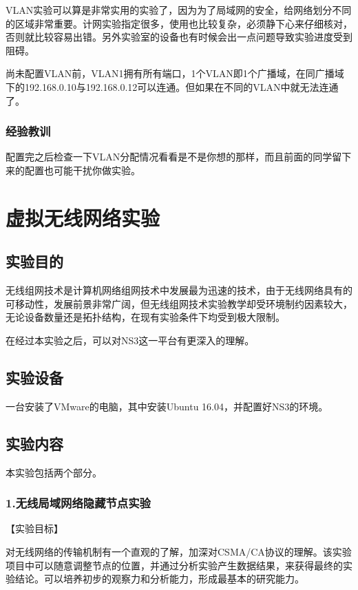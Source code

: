 \documentclass[lang=cn,11pt,a4paper,cite=authoryear]{elegantpaper}
\begin{document}
VLAN实验可以算是非常实用的实验了，因为为了局域网的安全，给网络划分不同的区域非常重要。计网实验指定很多，使用也比较复杂，必须静下心来仔细核对，否则就比较容易出错。另外实验室的设备也有时候会出一点问题导致实验进度受到阻碍。

尚未配置VLAN前，VLAN1拥有所有端口，1个VLAN即1个广播域，在同广播域下的192.168.0.10与192.168.0.12可以连通。但如果在不同的VLAN中就无法连通了。

\subsubsection{经验教训}

配置完之后检查一下VLAN分配情况看看是不是你想的那样，而且前面的同学留下来的配置也可能干扰你做实验。

\section{虚拟无线网络实验}
\subsection{实验目的}

无线组网技术是计算机网络组网技术中发展最为迅速的技术，由于无线网络具有的可移动性，发展前景非常广阔，但无线组网技术实验教学却受环境制约因素较大，无论设备数量还是拓扑结构，在现有实验条件下均受到极大限制。

在经过本实验之后，可以对NS3这一平台有更深入的理解。


\subsection{实验设备}
一台安装了VMware的电脑，其中安装Ubuntu 16.04，并配置好NS3的环境。

\subsection{实验内容}

本实验包括两个部分。

\subsubsection{1.无线局域网络隐藏节点实验}

【实验目标】

对无线网络的传输机制有一个直观的了解，加深对CSMA/CA协议的理解。该实验项目中可以随意调整节点的位置，并通过分析实验产生数据结果，来获得最终的实验结论。可以培养初步的观察力和分析能力，形成最基本的研究能力。
\end{document}
